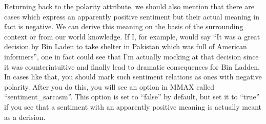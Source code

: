 \documentclass[11pt,a4paper]{article}
\begin{document}
Returning back to the polarity attribute, we should also mention that
there are cases which express an apparently positive sentiment but
their actual meaning in fact is negative. We can derive this meaning
on the basis of the surrounding context or from our world
knowledge. If I, for example, would say ``It was a great decision by
Bin Laden to take shelter in Pakistan which was full of American
informers'', one in fact could see that I'm actually mocking at that
decision since it was counterintuitive and finally lead to dramatic
consequences for Bin Ladden. In cases like that, you should mark such
sentiment relations as ones with negative polarity. After you do this,
you will see an option in MMAX called ``sentiment\_sarcasm''. This
option is set to ``false'' by default, but set it to ``true'' if you
see that a sentiment with an apparently positive meaning is actually
meant as a derision.

\end{document}
